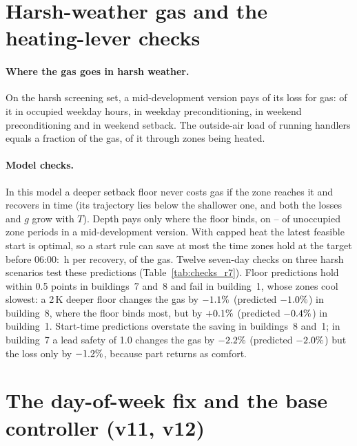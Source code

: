 \documentclass{article}
\begin{document}
\section{Harsh-weather gas and the heating-lever checks}
\label{app:levers}
\paragraph{Where the gas goes in harsh weather.} On the harsh screening set, a mid-development version pays \RSixDecGas{} of its loss for gas: \RSixDecOccWd{} of it in occupied weekday hours, \RSixDecPreWd{} in weekday preconditioning, \RSixDecPreWe{} in weekend preconditioning and \RSixDecSbWe{} in weekend setback. The outside-air load of running handlers equals a fraction \RSixDecVent{} of the gas, \RSixDecVentHeated{} of it through zones being heated.

\paragraph{Model checks.} In this model a deeper setback floor never costs gas if the zone reaches it and recovers in time (its trajectory lies below the shallower one, and both the losses and $g$ grow with $T$). Depth pays only where the floor binds, on \RSevBindLo--\RSevBindHi{} of unoccupied zone periods in a mid-development version. With capped heat the latest feasible start is optimal, so a start rule can save at most the time zones hold at the target before 06:00: \RSevHoldH\,h per recovery, \RSevHoldGas{} of the gas. Twelve seven-day checks on three harsh scenarios test these predictions (Table~\ref{tab:checks_r7}). Floor predictions hold within 0.5 points in buildings~7 and~8 and fail in building~1, whose zones cool slowest: a 2\,K deeper floor changes the gas by $-1.1\%$ (predicted $-1.0\%$) in building~8, where the floor binds most, but by $+0.1\%$ (predicted $-0.4\%$) in building~1. Start-time predictions overstate the saving in buildings~8 and~1; in building~7 a lead safety of 1.0 changes the gas by $-2.2\%$ (predicted $-2.0\%$) but the loss only by $-1.2\%$, because part returns as comfort.

\section{The day-of-week fix and the base controller (v11, v12)}
\label{app:note-v11}
\end{document}
